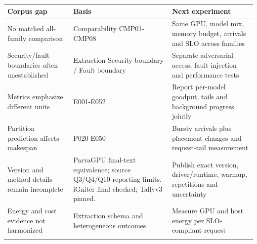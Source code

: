 \begin{longtable}{>{\raggedright\arraybackslash}p{}>{\raggedright\arraybackslash}p{}>{\raggedright\arraybackslash}p{}}
\toprule
\textbf{Corpus gap} & \textbf{Basis} & \textbf{Next experiment}\\\midrule\endhead
No matched all-family comparison & Comparability CMP01-CMP08 & Same GPU, model mix, memory budget, arrivals and SLO across families\\\addlinespace
Security/fault boundaries often unestablished & Extraction Security boundary / Fault boundary & Separate adversarial access, fault injection and performance tests\\\addlinespace
Metrics emphasize different units & E001-E052 & Report per-model goodput, tails and background progress jointly\\\addlinespace
Partition prediction affects makespan & P020 E050 & Bursty arrivals plus placement changes and request-tail measurement\\\addlinespace
Version and method details remain incomplete & ParvaGPU final-text equivalence; source Q3/Q4/Q10 reporting limits. iGniter final checked; Tallyv3 pinned. & Publish exact version, driver/runtime, warmup, repetitions and uncertainty\\\addlinespace
Energy and cost evidence not harmonized & Extraction schema and heterogeneous outcomes & Measure GPU and host energy per SLO-compliant request\\\addlinespace
\bottomrule\end{longtable}